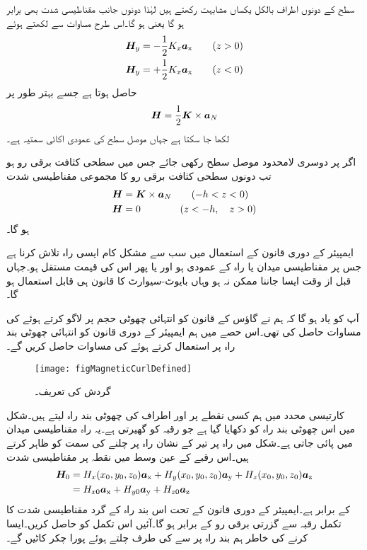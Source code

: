 سطح کے دونوں اطراف بالکل یکساں مشابہت رکھتے ہیں لہٰذا دونوں جانب  مقناطیسی شدت بھی برابر ہو گا یعنی  ہو گا۔اس طرح مساوات  سے  لکھتے ہوئے
\begin{align*}
{\ensuremath{{\boldsymbol{H}}}}_{y}&=-\frac{1}{2}K_x {\boldsymbol{a}}_{\textup{x}} \quad \quad (z>0)\\
{{\boldsymbol{H}}}_{y}&=+\frac{1}{2}K_x {\boldsymbol{a}}_{\textup{x}} \quad \quad (z<0)
\end{align*}
حاصل ہوتا ہے جسے  بہتر طور پر 
\begin{align}
{\ensuremath{{\boldsymbol{H}}}}=\frac{1}{2} {{\boldsymbol{K}}} \times {\boldsymbol{a}}_N
\end{align}
لکھا جا سکتا ہے جہاں  موصل سطح کی عمودی اکائی سمتیہ ہے۔

اگر  پر دوسری لامحدود موصل سطح رکھی جائے جس میں سطحی کثافت برقی رو  ہو تب دونوں سطحی کثافت برقی رو کا مجموعی مقناطیسی شدت
\begin{gather}
\begin{aligned}
{\ensuremath{{\boldsymbol{H}}}}&={{\boldsymbol{K}}} \times {\boldsymbol{a}}_N \quad \quad (-h <z < 0)\\
{{\boldsymbol{H}}}&=0 \quad \quad \quad \quad  (z<-h, \quad z>0) 
\end{aligned}
\end{gather}
ہو گا۔

ایمپیئر کے دوری قانون کے استعمال میں سب سے مشکل کام ایسی راہ تلاش کرنا ہے جس پر مقناطیسی میدان یا راہ کے عمودی ہو اور یا پھر اس کی قیمت مستقل ہو۔جہاں قبل از وقت ایسا جاننا ممکن نہ ہو وہاں بایوٹ-سیوارٹ کا قانون ہی قابل استعمال ہو گا۔ 

آپ کو یاد ہو گا کہ ہم نے گاؤس کے قانون کو انتہائی چھوٹی حجم پر لاگو کرتے ہوئے   کی مساوات حاصل کی تھی۔اس حصے میں ہم ایمپیئر کے دوری قانون کو انتہائی چھوٹی بند راہ پر استعمال کرتے ہوئے  کی مساوات حاصل کریں گے۔
\begin{figure}
\centering
\texttt{[image: figMagneticCurlDefined]}
\caption{گردش کی تعریف۔ }
\label{شکل-مقناطیسی_گردش_تعریف}
\end{figure}

کارتیسی محدد میں ہم کسی نقطے  پر   اور  اطراف کی چھوٹی بند راہ لیتے ہیں۔شکل  میں اس چھوٹی بند راہ کو دکھایا گیا ہے جو رقبہ  کو گھیرتی ہے۔یہ راہ مقناطیسی میدان  میں پائی جاتی ہے۔شکل میں راہ پر تیر کے نشان راہ پر چلنے کی سمت کو ظاہر کرتے  ہیں۔اس رقبے کے عین وسط میں نقطہ  پر مقناطیسی شدت 
\begin{align*}
{\ensuremath{{\boldsymbol{H}}}}_0&=H_x(x_0,y_0,z_0){\boldsymbol{a}}_{\textup{x}}+H_y(x_0,y_0,z_0){\boldsymbol{a}}_{\textup{y}}+H_z(x_0,y_0,z_0){\boldsymbol{a}}_{\textup{z}}\\
&=H_{x0}{\boldsymbol{a}}_{\textup{x}}+H_{y0}{\boldsymbol{a}}_{\textup{y}}+H_{z0}{\boldsymbol{a}}_{\textup{z}}
\end{align*}
کے برابر ہے۔ایمپیئر کے دوری قانون کے تحت اس بند راہ کے گرد مقناطیسی شدت کا تکمل رقبہ  سے گزرتی برقی رو کے برابر ہو گا۔آئیں اس تکمل کو حاصل کریں۔ایسا کرنے کی خاطر ہم بند راہ پر سے  کی طرف چلتے ہوئے پورا چکر کاٹیں گے۔

